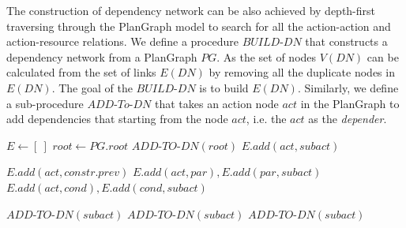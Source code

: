 The construction of dependency network can be also achieved by depth-first traversing through the PlanGraph model to search for all the action-action and action-resource relations. We define a procedure $BUILD\textrm{-}DN$ that constructs a dependency network from a PlanGraph $PG$. As the set of nodes $V(DN)$ can be calculated from the set of links $E(DN)$ by removing all the duplicate nodes in $E(DN)$. The goal of the $BUILD\textrm{-}DN$ is to build $E(DN)$. Similarly, we define a sub-procedure $ADD\textrm{-}To\textrm{-}DN$ that takes an action node $act$ in the PlanGraph to add dependencies that starting from the node $act$, i.e. the $act$ as the \emph{depender}.

{\footnotesize
\begin{algorithm}
\begin{algorithmic}[1]
	\State $E\gets [\:]$
	\State $root\gets PG.root$
	\State $ADD\textrm{-}TO\textrm{-}DN(root)$
\EndProcedure
{}
   		\State $E.add(act, subact)$
	\EndFor

   				\State $E.add(act, constr.prev)$ 
   			\EndIf
		\EndFor
   				\State $E.add(act, par), E.add(par, subact)$
			\EndFor
		\EndFor
   				\State $E.add(act, cond), E.add(cond, subact)$
			\EndFor
		\EndFor
   	\EndIf

   			\State $ADD\textrm{-}TO\textrm{-}DN(subact)$
		\EndFor
	\EndFor
   			\State $ADD\textrm{-}TO\textrm{-}DN(subact)$
		\EndFor
	\EndFor
   		\State $ADD\textrm{-}TO\textrm{-}DN(subact)$
	\EndFor
\EndProcedure
\end{algorithmic}
\end{algorithm}
}



